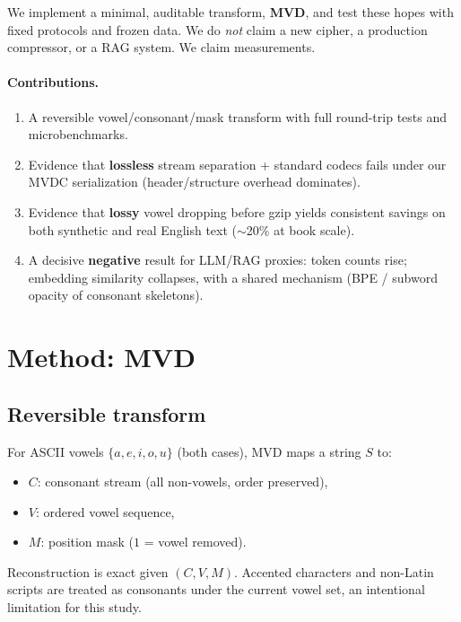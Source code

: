 \documentclass{article}
\begin{document}
We implement a minimal, auditable transform, \textbf{MVD}, and test these hopes with fixed protocols and frozen data. We do \emph{not} claim a new cipher, a production compressor, or a RAG system. We claim measurements.

\paragraph{Contributions.}

\begin{enumerate}
	\item A reversible vowel/consonant/mask transform with full round-trip tests and microbenchmarks.
	\item Evidence that \textbf{lossless} stream separation + standard codecs fails under our MVDC serialization (header/structure overhead dominates).
	\item Evidence that \textbf{lossy} vowel dropping before gzip yields consistent savings on both synthetic and real English text ($\sim$20\% at book scale).
	\item A decisive \textbf{negative} result for LLM/RAG proxies: token counts rise; embedding similarity collapses, with a shared mechanism (BPE / subword opacity of consonant skeletons).
\end{enumerate}

\section{Method: MVD}
\label{sec:method}

\subsection{Reversible transform}

For ASCII vowels $\{a,e,i,o,u\}$ (both cases), MVD maps a string $S$ to:

\begin{itemize}
	\item $C$: consonant stream (all non-vowels, order preserved),
	\item $V$: ordered vowel sequence,
	\item $M$: position mask ($1$ = vowel removed).
\end{itemize}

Reconstruction is exact given $(C,V,M)$. Accented characters and non-Latin scripts are treated as consonants under the current vowel set, an intentional limitation for this study.
\end{document}
